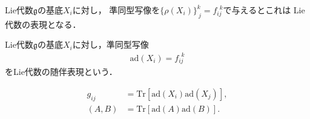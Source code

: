 \begin{lem}
	Lie代数\(\mathfrak{g}\)の基底\(X_{i}\)に対し，
	準同型写像を\(\{\rho(X_{i})\}^{k}_{\ j}=f_{ij}^{\ \ k}\)で与えるとこれは
	Lie代数の表現となる．
\end{lem}
\begin{defn}
	Lie代数\(\mathfrak{g}\)の基底\(X_{i}\)に対し，準同型写像
	\begin{align}
		\mathrm{ad}(X_{i})=f_{ij}^{\ \ k}
	\end{align}
	をLie代数の随伴表現という．
\end{defn}
\begin{cor}[随伴表現を用いたカルタン計量とキリング形式]
	\begin{align}
		g_{ij} & =\mathrm{Tr}[\mathrm{ad}(X_{i})\mathrm{ad}(X_{j})], \\
		(A,B)  & =\mathrm{Tr}[\mathrm{ad}(A)\mathrm{ad}(B)].
	\end{align}
\end{cor}
\section{}
